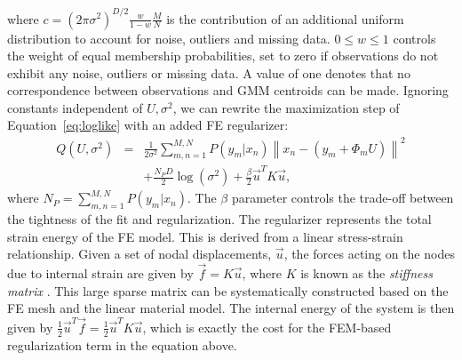 \documentclass[journal]{IEEEtran}
\newcommand{\trans}[1]{#1^{\scriptscriptstyle T}}
\begin{document}
where $c=(2\pi\sigma^2)^{D/2}\frac{w}{1-w}\frac{M}{N}$ is the contribution of an additional uniform distribution to account for noise, outliers and missing data. $0{\leq}w{\leq}1$ controls the weight of equal membership probabilities, set to zero if observations do not exhibit any noise, outliers or missing data. A value of one denotes that no correspondence between observations and GMM centroids can be made. Ignoring constants independent of $U,\sigma^2$, we can rewrite the maximization step of Equation~\eqref{eq:loglike} with an added FE regularizer:
\begin{eqnarray} \label{eq:obj}
Q(U,\sigma^2) &=& \frac{1}{2\sigma^2}\sum_{m,n=1}^{M,N}P(y_m|x_n)\left\|x_n- (y_m+\Phi_mU)\right\|^2 \nonumber\\
&& + \frac{N_PD}{2}\log(\sigma^2) + \frac{\beta}{2}\trans{\vec{u}}K\vec{u},
\end{eqnarray}
where $N_P=\sum_{m,n=1}^{M,N}P(y_m|x_n)$. The $\beta$ parameter controls the trade-off between the tightness of the fit and regularization. The regularizer represents the total strain energy of the FE model.  This is derived from a linear stress-strain relationship.  Given a set of nodal displacements, $\vec{u}$, the forces acting on the nodes due to internal strain are given by $\vec{f} = K\vec{u}$, where $K$ is known as the \emph{stiffness matrix} \cite{Bonet00a}.  This large sparse matrix can be systematically constructed based on the FE mesh and the linear material model.  The internal energy of the system is then given by $\frac{1}{2}\trans{\vec{u}}\vec{f}=\frac{1}{2}\trans{\vec{u}}K\vec{u}$, which is exactly the cost for the FEM-based regularization term in the equation above.
\end{document}
